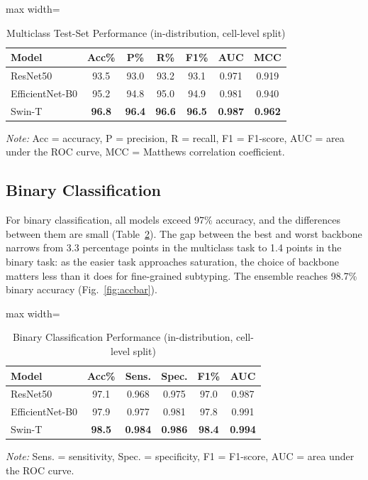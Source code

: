\documentclass[conference]{IEEEtran}
\begin{document}
\begin{table}[t]
\caption{Multiclass Test-Set Performance (in-distribution, cell-level split)}
\label{tab:multiclass}
\centering
\setlength{\tabcolsep}{3.5pt}
\begin{adjustbox}{max width=\columnwidth}
\begin{tabular}{lcccccc}
\toprule
\textbf{Model} & \textbf{Acc\%} & \textbf{P\%} & \textbf{R\%} & \textbf{F1\%} & \textbf{AUC} & \textbf{MCC}\\
\midrule
ResNet50        & 93.5 & 93.0 & 93.2 & 93.1 & 0.971 & 0.919\\
EfficientNet-B0 & 95.2 & 94.8 & 95.0 & 94.9 & 0.981 & 0.940\\
Swin-T          & \textbf{96.8} & \textbf{96.4} & \textbf{96.6} & \textbf{96.5} & \textbf{0.987} & \textbf{0.962}\\
\bottomrule
\end{tabular}
\end{adjustbox}
\begin{flushleft}
\footnotesize \textit{Note:} Acc = accuracy, P = precision, R = recall, F1 = F1-score, AUC = area under the ROC curve, MCC = Matthews correlation coefficient.
\end{flushleft}
\end{table}

\subsection{Binary Classification}

For binary classification, all models exceed 97\% accuracy, and the differences between them are small (Table~\ref{tab:binary}). The gap between the best and worst backbone narrows from 3.3 percentage points in the multiclass task to 1.4 points in the binary task: as the easier task approaches saturation, the choice of backbone matters less than it does for fine-grained subtyping. The ensemble reaches 98.7\% binary accuracy (Fig.~\ref{fig:accbar}).

\begin{table}[t]
\caption{Binary Classification Performance (in-distribution, cell-level split)}
\label{tab:binary}
\centering
\setlength{\tabcolsep}{3.5pt}
\begin{adjustbox}{max width=\columnwidth}
\begin{tabular}{lccccc}
\toprule
\textbf{Model} & \textbf{Acc\%} & \textbf{Sens.} & \textbf{Spec.} & \textbf{F1\%} & \textbf{AUC}\\
\midrule
ResNet50        & 97.1 & 0.968 & 0.975 & 97.0 & 0.987\\
EfficientNet-B0 & 97.9 & 0.977 & 0.981 & 97.8 & 0.991\\
Swin-T          & \textbf{98.5} & \textbf{0.984} & \textbf{0.986} & \textbf{98.4} & \textbf{0.994}\\
\bottomrule
\end{tabular}
\end{adjustbox}
\begin{flushleft}
\footnotesize \textit{Note:} Sens. = sensitivity, Spec. = specificity, F1 = F1-score, AUC = area under the ROC curve.
\end{flushleft}
\end{table}
\end{document}
